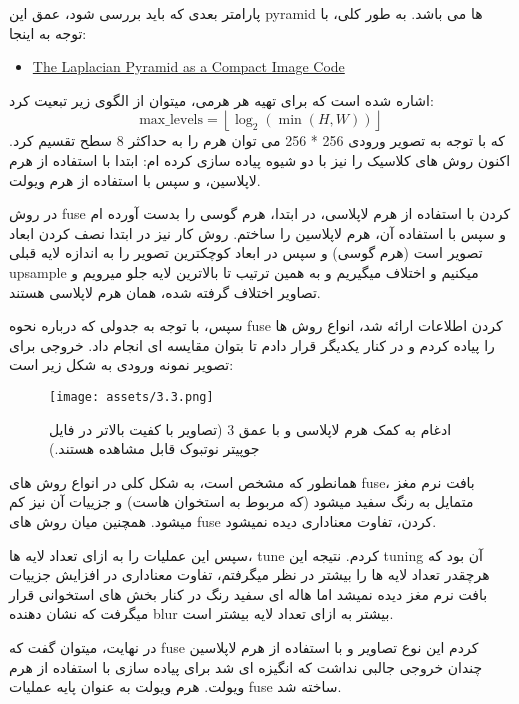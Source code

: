 \documentclass[a4paper,12pt]{article}
\begin{document}
پارامتر بعدی که باید بررسی شود، عمق این pyramid ها می باشد. به طور کلی، با توجه به اینجا:
\begin{latin}
	\begin{itemize}
		\item \href{https://ieeexplore.ieee.org/document/1095851}{The Laplacian Pyramid as a Compact Image Code}
	\end{itemize}
\end{latin}
اشاره شده است که برای تهیه هر هرمی، میتوان از الگوی زیر تبعیت کرد:
\[
\text{max\_levels} = \left\lfloor \log_2\left(\min(H, W)\right) \right\rfloor
\]
که با توجه به تصویر ورودی 256 * 256 می توان هرم را به حداکثر 8 سطح تقسیم کرد. 
اکنون روش های کلاسیک را نیز با دو شیوه پیاده سازی کرده ام:
ابتدا با استفاده از هرم لاپلاسین، و سپس با استفاده از هرم ویولت. 

در روش fuse کردن با استفاده از هرم لاپلاسی، در ابتدا، هرم گوسی را بدست آورده ام و سپس با استفاده آن، هرم لاپلاسین را ساختم. روش کار نیز در ابتدا نصف کردن ابعاد تصویر است (هرم گوسی) و سپس در ابعاد کوچکترین تصویر را به اندازه لایه قبلی upsample میکنیم و اختلاف میگیریم و به همین ترتیب تا بالاترین لایه جلو میرویم و تصاویر اختلاف گرفته شده، همان هرم لاپلاسی هستند.

سپس، با توجه به جدولی که درباره نحوه fuse کردن اطلاعات ارائه شد، انواع روش ها را پیاده کردم و در کنار یکدیگر قرار دادم تا بتوان مقایسه ای انجام داد. خروجی برای تصویر نمونه ورودی به شکل زیر است:

\begin{figure}[h]
	\centering
	\texttt{[image: assets/3.3.png]}
	\caption{\textcolor{CustomAccent}{ادغام به کمک هرم لاپلاسی و با عمق 3 (تصاویر با کفیت بالاتر در فایل جوپیتر نوتبوک قابل مشاهده هستند.)}}
\end{figure}
 
همانطور که مشخص است، به شکل کلی در انواع روش های fuse، بافت نرم مغز متمایل به رنگ سفید میشود (که مربوط به استخوان هاست) و جزییات آن نیز کم میشود. همچنین میان روش های fuse کردن، تفاوت معناداری دیده نمیشود.

سپس این عملیات را به ازای تعداد لایه ها، tune کردم. نتیجه این tuning آن بود که هرچقدر تعداد لایه ها را بیشتر در نظر میگرفتم، تفاوت معناداری در افزایش جزییات بافت نرم مغز دیده نمیشد اما هاله ای سفید رنگ در کنار بخش های استخوانی قرار میگرفت که نشان دهنده blur بیشتر به ازای تعداد لایه بیشتر است.

در نهایت، میتوان گفت که fuse کردم این نوع تصاویر و با استفاده از هرم لاپلاسین چندان خروجی جالبی نداشت که انگیزه ای شد برای پیاده سازی با استفاده از هرم ویولت. هرم ویولت به عنوان پایه عملیات fuse ساخته شد.
\end{document}
